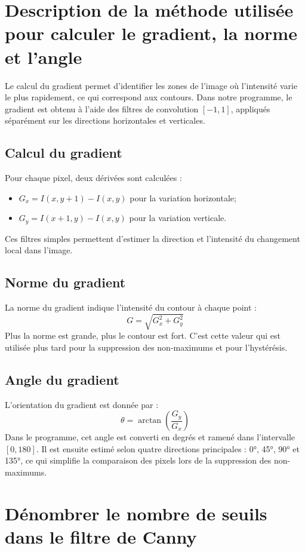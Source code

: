 \documentclass{article}
\begin{document}
\section{Description de la méthode utilisée pour calculer le gradient, la norme et l'angle}

Le calcul du gradient permet d’identifier les zones de l’image où l’intensité varie le plus rapidement, ce qui correspond aux contours.  
Dans notre programme, le gradient est obtenu à l’aide des filtres de convolution \([-1, 1]\), appliqués séparément sur les directions horizontales et verticales.

\subsection*{Calcul du gradient}
Pour chaque pixel, deux dérivées sont calculées :
\begin{itemize}
    \item \( G_x = I(x, y+1) - I(x, y) \) pour la variation horizontale;
    \item \( G_y = I(x+1, y) - I(x, y) \) pour la variation verticale.
\end{itemize}
Ces filtres simples permettent d’estimer la direction et l’intensité du changement local dans l’image.

\subsection*{Norme du gradient}
La norme du gradient indique l'intensité du contour à chaque point :
\[
G = \sqrt{G_x^2 + G_y^2}
\]
Plus la norme est grande, plus le contour est fort.  
C’est cette valeur qui est utilisée plus tard pour la suppression des non-maximums et pour l’hystérésis.

\subsection*{Angle du gradient}
L’orientation du gradient est donnée par :
\[
\theta = \arctan{\left(\frac{G_y}{G_x}\right)}
\]
Dans le programme, cet angle est converti en degrés et ramené dans l’intervalle \([0,180]\).  
Il est ensuite estimé selon quatre directions principales : 0°, 45°, 90° et 135°, ce qui simplifie la comparaison des pixels lors de la suppression des non-maximums.

\section{Dénombrer le nombre de seuils dans le filtre de Canny}
\end{document}
